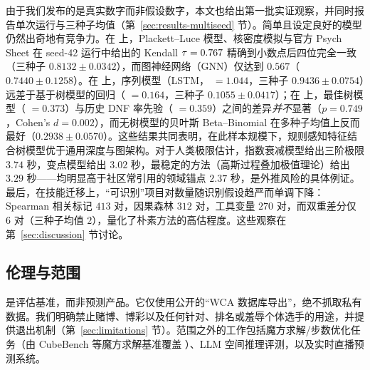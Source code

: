 由于我们发布的是真实数字而非假设数字，本文也给出第一批实证观察，并同时报告单次运行与三种子均值（第~\ref{sec:results-multiseed} 节）。简单且设定良好的模型仍然出奇地有竞争力。在  上，Plackett--Luce 模型、核密度模拟与官方 Psych Sheet 在 seed-42 运行中给出的 Kendall $\tau=0.767$ 精确到小数点后四位完全一致（三种子 $0.8132\pm0.0342$），而图神经网络（GNN）仅达到 $0.567$（$0.7440\pm0.1258$）。在  上，序列模型（LSTM，\maelog{} $=1.044$，三种子 $0.9436\pm0.0754$）远差于基于树模型的回归（\maelog{} $=0.164$，三种子 $0.1055\pm0.0417$）；在  上，最佳树模型（\aucpr{} $=0.373$）与历史 DNF 率先验（\aucpr{} $=0.359$）之间的差异\emph{并不}显著（$p=0.749$，Cohen's $d=0.002$），而无树模型的贝叶斯 Beta--Binomial 在多种子均值上反而最好（$0.2938\pm0.0570$）。这些结果共同表明，在此样本规模下，规则感知特征结合树模型优于通用深度与图架构。对于人类极限估计，指数衰减模型给出三阶极限 $3.74$ 秒，变点模型给出 $3.02$ 秒，最稳定的方法（高斯过程叠加极值理论）给出 $3.29$ 秒——均明显高于社区常引用的领域锚点 $2.37$ 秒，是外推风险的具体例证。最后，在技能迁移上，“可识别”项目对数量随识别假设趋严而单调下降：Spearman 相关标记 $413$ 对，因果森林 $312$ 对，工具变量 $270$ 对，而双重差分仅 $6$ 对（三种子均值 $2$），量化了朴素方法的高估程度。这些观察在第~\ref{sec:discussion} 节讨论。

\subsection{伦理与范围}
\label{sec:scope}

\wcabench{} 是评估基准，而非预测产品。它仅使用公开的“WCA 数据库导出”，绝不抓取私有数据。我们明确禁止赌博、博彩以及任何针对、排名或羞辱个体选手的用途，并提供退出机制（第~\ref{sec:limitations} 节）。范围之外的工作包括魔方求解/步数优化任务（由 CubeBench 等魔方求解基准覆盖 \citep{cubebench, cube_bench_mllm}）、LLM 空间推理评测，以及实时直播预测系统。
